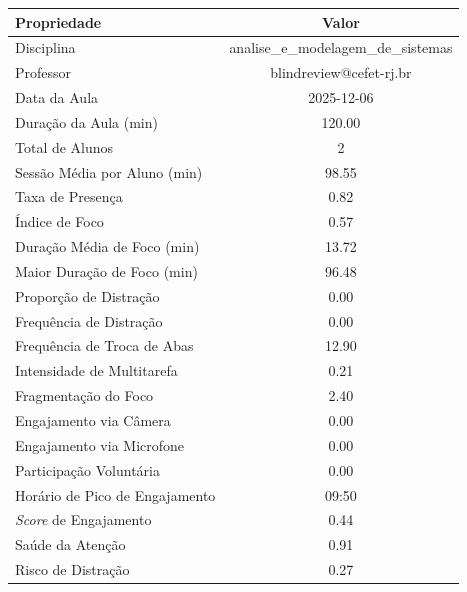\begin{table}[H]
    \centering
    \vspace{0.5cm}
    \begin{tabular}{|l|c|}
        \hline
        \textbf{Propriedade} & \textbf{Valor} \\
        \hline
        Disciplina & analise\_e\_modelagem\_de\_sistemas \\
        Professor & blindreview@cefet-rj.br \\
        Data da Aula & 2025-12-06 \\
        Duração da Aula (min) & 120.00 \\
        Total de Alunos & 2 \\
        Sessão Média por Aluno (min) & 98.55 \\
        Taxa de Presença & 0.82 \\
        Índice de Foco & 0.57 \\
        Duração Média de Foco (min) & 13.72 \\
        Maior Duração de Foco (min) & 96.48 \\
        Proporção de Distração & 0.00 \\
        Frequência de Distração & 0.00 \\
        Frequência de Troca de Abas & 12.90 \\
        Intensidade de Multitarefa & 0.21 \\
        Fragmentação do Foco & 2.40 \\
        Engajamento via Câmera & 0.00 \\
        Engajamento via Microfone & 0.00 \\
        Participação Voluntária & 0.00 \\
        Horário de Pico de Engajamento & 09:50 \\
        \textit{Score} de Engajamento & 0.44 \\
        Saúde da Atenção & 0.91 \\
        Risco de Distração & 0.27 \\

\end{tabular}
\end{table}
